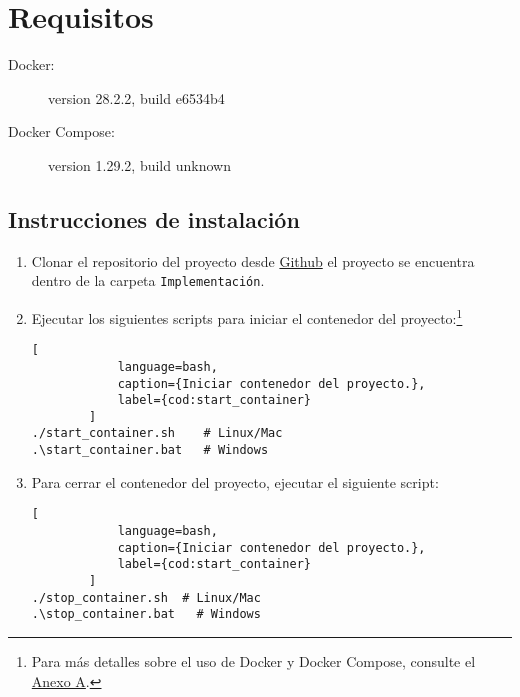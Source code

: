 	\section{Requisitos}
	\label{sec:requisitos-sistema}

	\begin{description}
		\item[Docker:] version 28.2.2, build e6534b4
		\item[Docker Compose:] version 1.29.2, build unknown
	\end{description}

	\subsection{Instrucciones de instalaci\'on}
	\label{sec:instalacion}

	\begin{enumerate}
		\item Clonar el repositorio del proyecto desde \href{https://github.com/Ic3manMtz/Servicio-Social.git}{Github} el proyecto se encuentra dentro de la carpeta \texttt{Implementaci\'on}.
		
		\item Ejecutar los siguientes scripts para iniciar el contenedor del proyecto:\footnote{Para más detalles sobre el uso de Docker y Docker Compose, consulte el \hyperref[anexo:docker]{Anexo A}.}
		\begin{lstlisting}[
			language=bash,
			caption={Iniciar contenedor del proyecto.},
			label={cod:start_container}
		]
./start_container.sh	# Linux/Mac
.\start_container.bat	# Windows
		\end{lstlisting}

		\item Para cerrar el contenedor del proyecto, ejecutar el siguiente script:
		\begin{lstlisting}[
			language=bash,
			caption={Iniciar contenedor del proyecto.},
			label={cod:start_container}
		]
./stop_container.sh  # Linux/Mac
.\stop_container.bat   # Windows
		\end{lstlisting}
	\end{enumerate}